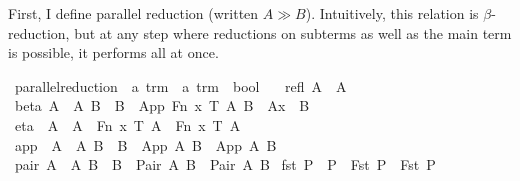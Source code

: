 First, I define parallel reduction (written \(A \gg B\)).
Intuitively, this relation is \(\beta\)-reduction, but at any step where reductions on subterms as well as the main term is possible, it performs all at once.

\begin{implementation}
\isamarkupfalse%
\ parallel{\isacharunderscore}reduction\ {\isacharcolon}{\isacharcolon}\ {\isachardoublequoteopen}{\isacharprime}a\ trm\ {\isasymRightarrow}\ {\isacharprime}a\ trm\ {\isasymRightarrow}\ bool{\isachardoublequoteclose}\ \isanewline
\ \ refl{\isacharcolon}\ {\isachardoublequoteopen}A\ {\isachargreater}{\isachargreater}\ A{\isachardoublequoteclose}\isanewline
{\isacharbar}\ beta{\isacharcolon}\ {\isachardoublequoteopen}{\isasymlbrakk}A\ {\isachargreater}{\isachargreater}\ A{\isacharprime}{\isacharsemicolon}\ B\ {\isachargreater}{\isachargreater}\ B{\isacharprime}{\isasymrbrakk}\ {\isasymLongrightarrow}\ {\isacharparenleft}App\ {\isacharparenleft}Fn\ x\ T\ A{\isacharparenright}\ B{\isacharparenright}\ {\isachargreater}{\isachargreater}\ {\isacharparenleft}A{\isacharprime}{\isacharbrackleft}x\ {\isacharcolon}{\isacharcolon}{\isacharequal}\ B{\isacharprime}{\isacharbrackright}{\isacharparenright}{\isachardoublequoteclose}\isanewline
{\isacharbar}\ eta{\isacharcolon}\ \ {\isachardoublequoteopen}A\ {\isachargreater}{\isachargreater}\ A{\isacharprime}\ {\isasymLongrightarrow}\ {\isacharparenleft}Fn\ x\ T\ A{\isacharparenright}\ {\isachargreater}{\isachargreater}\ {\isacharparenleft}Fn\ x\ T\ A{\isacharprime}{\isacharparenright}{\isachardoublequoteclose}\isanewline
{\isacharbar}\ app{\isacharcolon}\ \ {\isachardoublequoteopen}{\isasymlbrakk}A\ {\isachargreater}{\isachargreater}\ A{\isacharprime}{\isacharsemicolon}\ B\ {\isachargreater}{\isachargreater}\ B{\isacharprime}{\isasymrbrakk}\ {\isasymLongrightarrow}\ {\isacharparenleft}App\ A\ B{\isacharparenright}\ {\isachargreater}{\isachargreater}\ {\isacharparenleft}App\ A{\isacharprime}\ B{\isacharprime}{\isacharparenright}{\isachardoublequoteclose}\isanewline
{\isacharbar}\ pair{\isacharcolon}\ {\isachardoublequoteopen}{\isasymlbrakk}A\ {\isachargreater}{\isachargreater}\ A{\isacharprime}{\isacharsemicolon}\ B\ {\isachargreater}{\isachargreater}\ B{\isacharprime}{\isasymrbrakk}\ {\isasymLongrightarrow}\ {\isacharparenleft}Pair\ A\ B{\isacharparenright}\ {\isachargreater}{\isachargreater}\ {\isacharparenleft}Pair\ A{\isacharprime}\ B{\isacharprime}{\isacharparenright}{\isachardoublequoteclose}\isanewline
{\isacharbar}\ fst{}{\isacharcolon}\ {\isachardoublequoteopen}P\ {\isachargreater}{\isachargreater}\ P{\isacharprime}\ {\isasymLongrightarrow}\ {\isacharparenleft}Fst\ P{\isacharparenright}\ {\isachargreater}{\isachargreater}\ {\isacharparenleft}Fst\ P{\isacharprime}{\isacharparenright}{\isachardoublequoteclose}\isanewline

\end{implementation}
